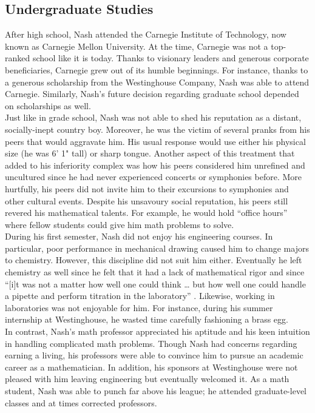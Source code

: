 \documentclass[12pt]{article}
\begin{document}
\subsection{Undergraduate Studies}
 
After high school, Nash attended the Carnegie Institute of Technology, now known as Carnegie Mellon University. At the time, Carnegie was not a top-ranked school like it is today. Thanks to visionary leaders and generous corporate beneficiaries, Carnegie grew out of its humble beginnings. For instance, thanks to a generous scholarship from the Westinghouse Company, Nash was able to attend Carnegie. Similarly, Nash's future decision regarding graduate school depended on scholarships as well.\\

Just like in grade school, Nash was not able to shed his reputation as a distant, socially-inept country boy. Moreover, he was the victim of several pranks from his peers that would aggravate him. His usual response would use either his physical size (he was 6' 1" tall) or sharp tongue. Another aspect of this treatment that added to his inferiority complex was how his peers considered him unrefined and uncultured since he had never experienced concerts or symphonies before. More hurtfully, his peers did not invite him to their excursions to symphonies and other cultural events. Despite his unsavoury social reputation, his peers still revered his mathematical talents. For example, he would hold ``office hours'' where fellow students could give him math problems to solve.\\

During his first semester, Nash did not enjoy his engineering courses. In particular, poor performance in mechanical drawing caused him to change majors to chemistry. However, this discipline did not suit him either. Eventually he left chemistry as well since he felt that it had a lack of mathematical rigor and since ``[i]t was not a matter how well one could think … but how well one could handle a pipette and perform titration in the laboratory'' \cite{24}. Likewise, working in laboratories was not enjoyable for him. For instance, during his summer internship at Westinghouse, he wasted time carefully fashioning a brass egg.\\

In contrast, Nash's math professor appreciated his aptitude and his keen intuition in handling complicated math problems. Though Nash had concerns regarding earning a living, his professors were able to convince him to pursue an academic career as a mathematician. In addition, his sponsors at Westinghouse were not pleased with him leaving engineering but eventually welcomed it. As a math student, Nash was able to punch far above his league; he attended graduate-level classes and at times corrected professors.\\
\end{document}
